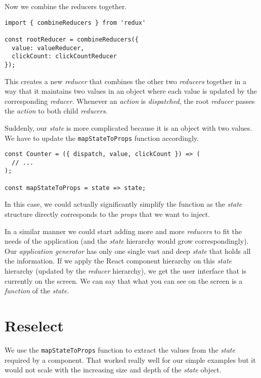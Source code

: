 Now we combine the reducers together.

\begin{verbatim}
import { combineReducers } from 'redux'

const rootReducer = combineReducers({
  value: valueReducer,
  clickCount: clickCountReducer
});
\end{verbatim}

This creates a new \emph{reducer} that combines the other two \emph{reducers} together in a way that it maintains two values in an object where each value is updated by the corresponding \emph{reducer}. Whenever an \emph{action} is \emph{dispatched}, the root \emph{reducer} passes the \emph{action} to both child \emph{reducers}.

Suddenly, our \emph{state} is more complicated because it is an object with two values. We have to update the \texttt{mapStateToProps} function accordingly.

\begin{verbatim}
const Counter = ({ dispatch, value, clickCount }) => (
  // ...
);

const mapStateToProps = state => state;
\end{verbatim}

In this case, we could actually significantly simplify the function as the \emph{state} structure directly corresponds to the \emph{props} that we want to inject.

In a similar manner we could start adding more and more \emph{reducers} to fit the needs of the application (and the \emph{state} hierarchy would grow correspondingly). Our \emph{application generator} has only one single vast and deep \emph{state} that holds all the information. If we apply the React component hierarchy on this \emph{state} hierarchy (updated by the \emph{reducer} hierarchy), we get the user interface that is currently on the screen.  We can say that what you can see on the screen is a \emph{function} of the \emph{state}.


\section{Reselect}

We use the \texttt{mapStateToProps} function to extract the values from the \emph{state} required by a component. That worked really well for our simple examples but  it would not scale with the increasing size and depth of the \emph{state} object.

